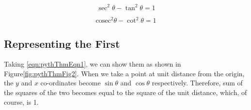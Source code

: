 \documentclass{article}
\begin{document}
    \begin{equation}
            \sec^2\theta - \tan^2\theta = 1
            \label{eqn:pythThmEqn2}
    \end{equation}
    
    \begin{equation}
            \mathrm{cosec}^2\theta - \cot^2\theta = 1
            \label{eqn:pythThmEqn3}
    \end{equation}

    \subsection{Representing the First}
        Taking \ref{eqn:pythThmEqn1}, we can show them as shown in Figure\ref{fig:pythThmFig2}. When we take a point at unit distance from the origin, the $y$ and $x$ co-ordinates become $\sin\theta$ and $\cos\theta$ respectively. Therefore, sum of the squares of the two becomes equal to the square of the unit distance, which, of course, is 1.
    
\end{document}
